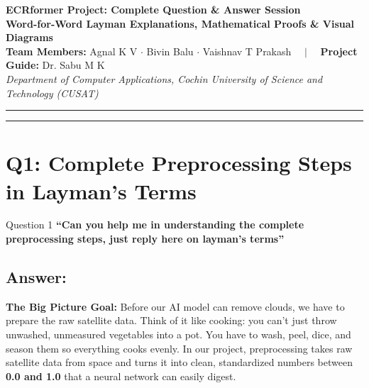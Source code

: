 \documentclass[11pt,a4paper]{article}
\begin{document}
\begin{center}
    {\LARGE \textbf{\textcolor{primary}{ECRformer Project: Complete Question \& Answer Session}}}\\[0.4em]
    {\Large \textbf{Word-for-Word Layman Explanations, Mathematical Proofs \& Visual Diagrams}}\\[0.6em]
    {\small \textbf{Team Members:} Agnal K V $\cdot$ Bivin Balu $\cdot$ Vaishnav T Prakash $\quad|\quad$ \textbf{Project Guide:} Dr. Sabu M K}\\[0.2em]
    {\small \textit{Department of Computer Applications, Cochin University of Science and Technology (CUSAT)}}
\end{center}
\vspace{-0.4em}
\noindent\rule{\linewidth}{1.2pt}

\tableofcontents
\vspace{0.8em}
\noindent\rule{\linewidth}{0.6pt}
\newpage

\section{Q1: Complete Preprocessing Steps in Layman's Terms}

\begin{questionbox}{Question 1}
\textbf{``Can you help me in understanding the complete preprocessing steps, just reply here on layman's terms''}
\end{questionbox}

\subsection*{Answer:}
\textbf{The Big Picture Goal:} Before our AI model can remove clouds, we have to prepare the raw satellite data. Think of it like cooking: you can't just throw unwashed, unmeasured vegetables into a pot. You have to wash, peel, dice, and season them so everything cooks evenly. In our project, preprocessing takes raw satellite data from space and turns it into clean, standardized numbers between \textbf{0.0 and 1.0} that a neural network can easily digest.
\end{document}
